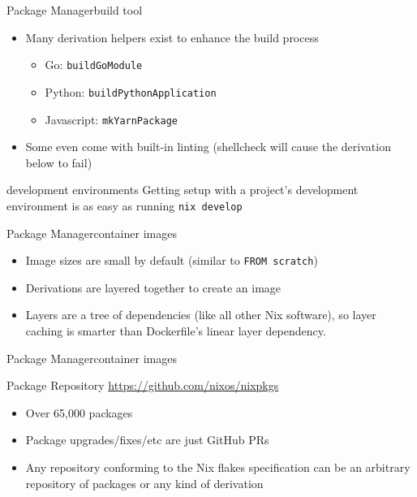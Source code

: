 \documentclass{beamer}
\begin{document}
\begin{frame}{Package Manager}{build tool}
	\begin{itemize}
		\item Many derivation helpers exist to enhance the build process
		      \begin{itemize}
			      \item Go: \lstinline{buildGoModule}
			      \item Python: \lstinline{buildPythonApplication}
			      \item Javascript: \lstinline{mkYarnPackage}
		      \end{itemize}
		\item Some even come with built-in linting (shellcheck will cause the
		      derivation below to fail)
	\end{itemize}
	
\end{frame}

\begin{frame}{development environments}
	Getting setup with a project's development environment is as easy as
	running \lstinline!nix develop!
	
\end{frame}

\begin{frame}{Package Manager}{container images}
	\begin{itemize}
		\item Image sizes are small by default (similar to \lstinline{FROM scratch})
		\item Derivations are layered together to create an image
		\item Layers are a tree of dependencies (like all other Nix software),
		      so layer caching is smarter than Dockerfile's linear layer
		      dependency.
	\end{itemize}
	
\end{frame}

\begin{frame}{Package Manager}{container images}
	
\end{frame}

\begin{frame}{Package Repository}
	\url{https://github.com/nixos/nixpkgs}
	\begin{itemize}
		\item Over 65,000 packages
		\item Package upgrades/fixes/etc are just GitHub PRs
		\item Any repository conforming to the Nix flakes specification can be
		      an arbitrary repository of packages or any kind of derivation
	\end{itemize}
\end{frame}
\end{document}
